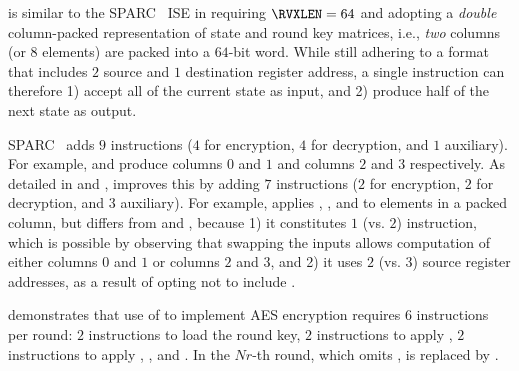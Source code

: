 
is similar to the SPARC~\cite[Page 109]{SPARC:16} ISE in
requiring
$\RVXLEN = 64$
and adopting a 
{\em double}
column-packed 
representation of state and round key matrices,
i.e., {\em two} columns (or $8$ elements) are packed into a $64$-bit word.
While still adhering to a format that
includes $2$ source and $1$ destination register address,
a single instruction can therefore 
1) accept  all  of the current state as  input,
   and
2) produce half of the next    state as output.

SPARC~\cite[Page 109]{SPARC:16}
adds
$ 9$
instructions ($4$ for encryption, $4$ for decryption, and $1$ auxiliary).
For example,
and
produce
columns $0$ and $1$
and
columns $2$ and $3$
respectively.
As detailed in
and
,
improves this by 
adding 
$ 7$
instructions ($2$ for encryption, $2$ for decryption, and $3$ auxiliary).
For example,
applies
, , and   
to elements in   a packed column,
but differs from 
and
,
because
1) it constitutes
   $1$ (vs. $2$)
   instruction,
   which is possible by observing that swapping the inputs allows 
   computation of either 
   columns $0$ and $1$ 
   or 
   columns $2$ and $3$,
   and
2) it uses 
   $2$ (vs. $3$)
   source register addresses, 
   as a result of opting not to include
   .

demonstrates that use of  to implement AES encryption requires
$ 6$ instructions per round:
$ 2$            
     instructions to load the round key,
$ 2$            
     instructions to apply ,
$ 2$   
     instructions to apply , , and .
In the $Nr$-th round, which omits ,
is replaced by 
     .

